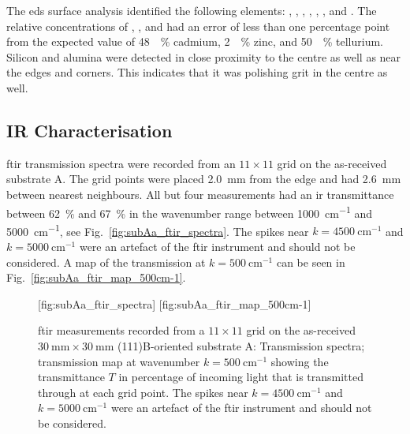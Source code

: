 The \ac{eds} surface analysis identified the following elements: , , , , , , and . The relative concentrations of , , and  had an error of less than one percentage point from the expected value of \SI{48}{\atomic\percent} cadmium, \SI{2}{\atomic\percent} zinc, and \SI{50}{\atomic\percent} tellurium. Silicon and alumina were detected in close proximity to the centre as well as near the edges and corners. This indicates that it was polishing grit in the centre as well. %
\subsection{IR Characterisation}

\Ac{ftir} transmission spectra were recorded from an $11\times11$ grid on the as-received substrate A. The grid points were placed \SI{2.0}{\milli\metre} from the edge and had \SI{2.6}{\milli\metre} between nearest neighbours. All but four measurements had an \ac{ir} transmittance between \SI{62}{\percent} and \SI{67}{\percent} in the wavenumber range between \SI{1000}{\centi\metre^{-1}} and \SI{5000}{\centi\metre^{-1}}, see Fig.~\ref{fig:subAa_ftir_spectra}. The spikes near $k=\SI{4500}{\centi\metre^{-1}}$ and $k=\SI{5000}{\centi\metre^{-1}}$ were an artefact of the \ac{ftir} instrument and should not be considered. A map of the transmission at $k=\SI{500}{\centi\metre^{-1}}$ can be seen in Fig.~\ref{fig:subAa_ftir_map_500cm-1}.

\begin{figure}[htbp]
    \centering
    [fig:subAa_ftir_spectra]
    \hfill
    [fig:subAa_ftir_map_500cm-1]
    \caption[\Ac{ftir} measurements of the as-received substrate A.]{\Ac{ftir} measurements recorded from a $11\times11$ grid on the as-received $\SI{30}{\milli\metre}\times\SI{30}{\milli\metre}$ (111)B-oriented substrate A:  Transmission spectra;  transmission map at wavenumber $k=\SI{500}{\centi\metre^{-1}}$ showing the transmittance $T$ in percentage of incoming light that is transmitted through at each grid point. The spikes near $k=\SI{4500}{\centi\metre^{-1}}$ and $k=\SI{5000}{\centi\metre^{-1}}$ were an artefact of the \ac{ftir} instrument and should not be considered.}
\end{figure}

